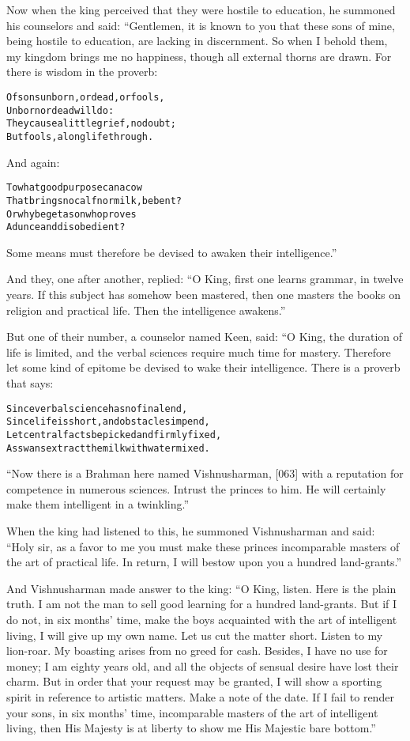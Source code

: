 \documentclass{article}
\renewenvironment{verbatim}{\begin{alltt}\normalfont\begin{centering}}{\end{centering}\end{alltt}}
\begin{document}
Now when the king perceived that they were hostile to education, he
summoned his counselors and said: “Gentlemen, it is known to you
that these sons of mine, being hostile to education, are lacking in
discernment. So when I behold them, my kingdom brings me no
happiness, though all external thorns are drawn. For there is
wisdom in the proverb:

\begin{verbatim}
Of sons unborn, or dead, or fools,
    Unborn or dead will do:
They cause a little grief, no doubt;
    But fools, a long life through.
\end{verbatim}
And again:

\begin{verbatim}
To what good purpose can a cow
    That brings no calf nor milk, be bent?
Or why beget a son who proves
    A dunce and disobedient?
\end{verbatim}
Some means must therefore be devised to awaken their
intelligence.”

And they, one after another, replied:
``O King, first one learns grammar, in twelve years. If this subject has somehow been mastered, then one masters the books on religion and practical life. Then the intelligence awakens.''

But one of their number, a counselor named Keen, said: “O King, the
duration of life is limited, and the verbal sciences require much
time for mastery. Therefore let some kind of epitome be devised to
wake their intelligence. There is a proverb that says:

\begin{verbatim}
Since verbal science has no final end,
Since life is short, and obstacles impend,
Let central facts be picked and firmly fixed,
As swans extract the milk with water mixed.
\end{verbatim}
``Now there is a Brahman here named Vishnusharman, [063] with a reputation for competence in numerous sciences. Intrust the princes to him. He will certainly make them intelligent in a twinkling.''

When the king had listened to this, he summoned Vishnusharman and
said:
``Holy sir, as a favor to me you must make these princes incomparable masters of the art of practical life. In return, I will bestow upon you a hundred land-grants.''

And Vishnusharman made answer to the king:
``O King, listen. Here is the plain truth. I am not the man to sell good learning for a hundred land-grants. But if I do not, in six months' time, make the boys acquainted with the art of intelligent living, I will give up my own name. Let us cut the matter short. Listen to my lion-roar. My boasting arises from no greed for cash. Besides, I have no use for money; I am eighty years old, and all the objects of sensual desire have lost their charm. But in order that your request may be granted, I will show a sporting spirit in reference to artistic matters. Make a note of the date. If I fail to render your sons, in six months' time, incomparable masters of the art of intelligent living, then His Majesty is at liberty to show me His Majestic bare bottom.''
\end{document}
